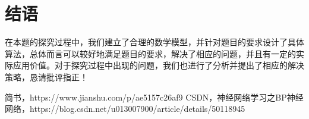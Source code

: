 \documentclass{article}
\begin{document}
	\section{结语}
	在本题的探究过程中，我们建立了合理的数学模型，并针对题目的要求设计了具体算法，总体而言可以较好地满足题目的要求，解决了相应的问题，并且有一定的实际应用价值。对于探究过程中出现的问题，我们也进行了分析并提出了相应的解决策略，恳请批评指正！
	
	\begin{thebibliography}{10}  
		简书，https://www.jianshu.com/p/ae5157c26af9
		CSDN，神经网络学习之BP神经网络，https://blog.csdn.net/u013007900/article/details/50118945
	\end{thebibliography}
	
\end{document}
